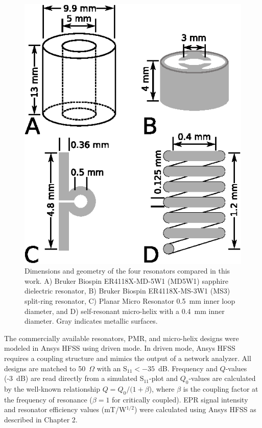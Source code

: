 \begin{figure}[htb]
\centering
 \includegraphics{Kapitel/Appendix/Images/S1-Geometries.eps}
 \caption[Geometries of resonators in this work.]{Dimensions and geometry of the four resonators compared in this work. A) Bruker Biospin ER4118X-MD-5W1 (MD5W1) sapphire dielectric resonator, B) Bruker Biospin ER4118X-MS-3W1 (MS3) split-ring resonator, C) Planar Micro Resonator 0.5~mm inner loop diameter, and D) self-resonant micro-helix with a 0.4~mm inner diameter. Gray indicates metallic surfaces.}
 \label{fig:geo}
\end{figure}

The commercially available resonators, PMR, and micro-helix designs were modeled in Ansys HFSS using driven mode. In driven mode, Ansys HFSS requires a coupling structure and mimics the output of a network analyzer. All designs are matched to 50~$\Omega$ with an S$_{11} < -35$~dB. Frequency and $Q$-values (-3~dB) are read directly from a simulated S$_{11}$-plot and $Q_0$-values are calculated by the well-known relationship $Q=Q_0/(1+\beta$), where $\beta$ is the coupling factor at the frequency of resonance ($\beta=1$ for critically coupled). \cite{ginzton1957microwave} EPR signal intensity and resonator efficiency values (mT/W$^{1/2}$) were calculated using Ansys HFSS \cite{misrabook} as described in Chapter 2. 


